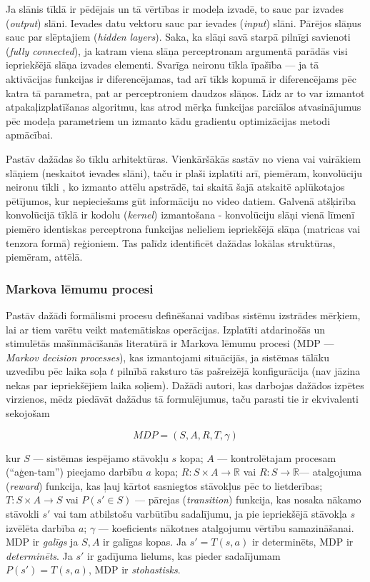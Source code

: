 \documentclass[12pt, a4paper]{article}
\numberwithin{equation}{section} %
\begin{document}
Ja slānis tīklā ir pēdējais un tā vērtības ir modeļa izvadē, to sauc par izvades (\textit{output}) slāni. Ievades datu vektoru sauc par ievades (\textit{input}) slāni. Pārējos slāņus sauc par slēptajiem (\textit{hidden layers}). Saka, ka slāņi savā starpā pilnīgi savienoti (\textit{fully connected}), ja katram viena slāņa perceptronam argumentā parādās visi iepriekšējā slāņa izvades elementi. Svarīga neironu tīkla īpašība --- ja tā aktivācijas funkcijas ir diferencējamas, tad arī tīkls kopumā ir diferencējams pēc katra tā parametra, pat ar perceptroniem daudzos slāņos. Līdz ar to var izmantot atpakaļizplatīšanas algoritmu, kas atrod mērķa funkcijas parciālos atvasinājumus pēc modeļa parametriem un izmanto kādu gradientu optimizācijas metodi apmācībai.

Pastāv dažādas šo tīklu arhitektūras. Vienkāršākās sastāv no viena vai vairākiem slāņiem (neskaitot ievades slāni), taču ir plaši izplatīti arī, piemēram, konvolūciju neironu tīkli \cite{krizhevsky2012imagenet}, ko izmanto attēlu apstrādē, tai skaitā šajā atskaitē aplūkotajos pētījumos, kur nepieciešams gūt informāciju no video datiem. Galvenā atšķirība konvolūcijā tīklā ir kodolu (\textit{kernel}) izmantošana - konvolūciju slāņi vienā līmenī piemēro identiskas perceptrona funkcijas nelieliem iepriekšējā slāņa (matricas vai tenzora formā) reģioniem. Tas palīdz identificēt dažādas lokālas struktūras, piemēram, attēlā. 

\subsubsection{Markova lēmumu procesi}

Pastāv dažādi formālismi procesu definēšanai vadības sistēmu izstrādes mērķiem, lai ar tiem varētu veikt matemātiskas operācijas. Izplatīti atdarinošās un stimulētās mašīnmācīšanās literatūrā ir Markova lēmumu procesi (MDP --- \textit{Markov decision processes}), kas izmantojami situācijās, ja sistēmas tālāku uzvedību pēc laika soļa $t$ pilnībā raksturo tās pašreizējā konfigurācija (nav jāzina nekas par iepriekšējiem laika soļiem). Dažādi autori, kas darbojas dažādos izpētes virzienos, mēdz piedāvāt dažādus tā formulējumus, taču parasti tie ir ekvivalenti sekojošam \cite{attia2018global}

\begin{equation} 
    MDP = (S,A,R,T, \gamma)
\end{equation}

kur $S$ --- sistēmas iespējamo stāvokļu $s$ kopa; $A$ --- kontrolētajam procesam (``aģen-tam'') pieejamo darbību $a$ kopa; $R: S \times A \rightarrow \mathbb{R}$ vai $R: S \rightarrow \mathbb{R}$--- atalgojuma (\textit{reward}) funkcija, kas ļauj kārtot sasniegtos stāvokļus pēc to lietderības; $T: S \times A \rightarrow S$ vai $P(s' \in S)$ --- pārejas (\textit{transition}) funkcija, kas nosaka nākamo stāvokli $s'$ vai tam atbilstošu varbūtību sadalījumu, ja pie iepriekšējā stāvokļa $s$ izvēlēta darbība $a$; $\gamma$ --- koeficients nākotnes atalgojumu vērtību samazināšanai. MDP ir \textit{galīgs} ja $S,A$ ir galīgas kopas. Ja $s' = T(s,a)$ ir determinēts, MDP ir \textit{determinēts}. Ja $s'$ ir gadījuma lielums, kas pieder sadalījumam $P(s')=T(s,a)$, MDP ir \textit{stohastisks}.
\end{document}
